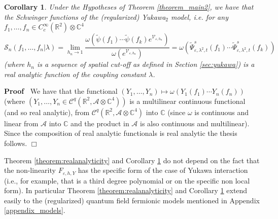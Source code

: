 \documentclass{article}
\newenvironment{proof}{\noindent\textbf{Proof\ }}{\hspace*{\fill}$\Box$\medskip}
\newtheorem{corollary}[theorem]{Corollary}
\begin{document}
\begin{corollary}
  \label{coroallry:realanalytic}Under the Hypotheses of Theorem
  \ref{theorem_main2}, we have that the Schwinger functions of the
  (regularized) Yukawa$_2$ model, i.e. for any $f_1, \ldots, f_n \in
  C^{\infty}_c (\mathbb{R}^2) \otimes \mathbb{C}^4$
  \begin{equation}
    \mathcal{S}_n (f_1, \ldots, f_n | \lambda) = \lim_{h_n \rightarrow 1}
    \frac{\omega \left( \tilde{\psi} (f_1) \cdots \tilde{\psi} (f_k)
    e^{\mathcal{V}_{\varepsilon, h_n}} \right)}{\omega \left(
    e^{\mathcal{V}_{\varepsilon, h_n}} \right)} = \omega
    (\tilde{\Psi}_{\varepsilon, \lambda^2, t}^s (f_1) \cdots
    \tilde{\Psi}_{\varepsilon, \lambda^2, t}^s (f_k))
  \end{equation}
  (where $h_n$ is a sequence of spatial cut-off as defined in Section
  \ref{sec:yukawa}) is a real analytic function of the coupling constant
  $\lambda$.
\end{corollary}

\begin{proof}
  We have that the functional $(Y_1, \ldots, Y_n) \mapsto \omega (Y_1 (f_1)
  \cdots Y_n (f_n))$ (where $(Y_1, \ldots, Y_n \in \mathcal{C}^q
  (\mathbb{R}^2, \mathcal{A} \otimes \mathbb{C}^4))$ is a multilinear
  continuous functional (and so real analytic), from $\mathcal{C}^q
  (\mathbb{R}^2, \mathcal{A} \otimes \mathbb{C}^4)$ into $\mathbb{C}$ (since
  $\omega$ is continuous and linear from $\mathcal{A}$ into $\mathbb{C}$ and
  the product in $\mathcal{A}$ is also continuous and multilinear). Since the
  composition of real analytic functionals is real analytic the thesis
  follows.
\end{proof}

\begin{remark}
  Theorem \ref{theorem:realanalyticity} and Corollary
  \ref{coroallry:realanalytic} do not depend on the fact that the
  non-linearity $F_{\varepsilon, h, Y}$ has the specific form of the case of
  Yukawa interaction (i.e., for example, that is a third degree polynomial or
  on the specific non local form). In particular Theorem
  \ref{theorem:realanalyticity} and Corollary \ref{coroallry:realanalytic}
  extend easily to the (regularized) quantum field fermionic models mentioned
  in Appendix \ref{appendix_models}.
\end{remark}
\end{document}
